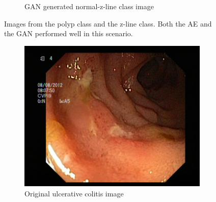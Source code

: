 \begin{figure}[h]
\begin{subfigure}[t]{\myfigsizethree}
            \caption{GAN generated normal-z-line class image}    
            \label{fig:z_GAN_CORNER1}
        \end{subfigure}
        \caption{Images from the polyp class and the z-line class. Both the AE and the GAN performed well in this scenario.} 
        \label{fig:AE_GAN_CORNER1}
\end{figure}
    
\begin{figure}[h]
        \tiny
        \begin{subfigure}[t]{\myfigsizethree}
            \centering
            \includegraphics[height=\textwidth ,width=\textwidth]{experiments/figures/blackcorner/ucORIG.jpg}
            \caption{ Original ulcerative colitis image}    
            \label{fig:polyp_ORIG_CORNER2}
        \end{subfigure}
        \qquad
        \begin{subfigure}[t]{\myfigsizethree}
            \centering

\end{subfigure}
\end{figure}
